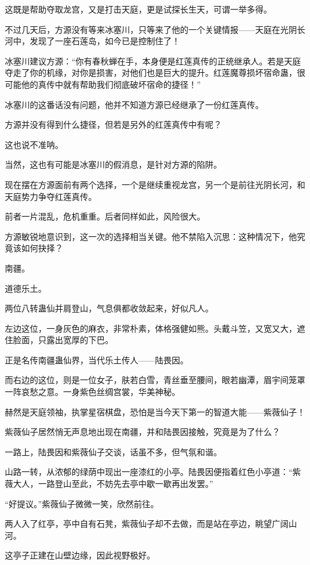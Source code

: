 \begin{this_body}
这既是帮助夺取龙宫，又是打击天庭，更是试探长生天，可谓一举多得。

不过几天后，方源没有等来冰塞川，只等来了他的一个关键情报——天庭在光阴长河中，发现了一座石莲岛，如今已是控制住了！

冰塞川建议方源：“你有春秋蝉在手，本身便是红莲真传的正统继承人。若是天庭夺走了你的机缘，对你是损害，对他们也是巨大的提升。红莲魔尊损坏宿命蛊，很可能他的真传中就有帮助我们彻底破坏宿命的捷径！”

冰塞川的这番话没有问题，他并不知道方源已经继承了一份红莲真传。

方源并没有得到什么捷径，但若是另外的红莲真传中有呢？

这也说不准呐。

当然，这也有可能是冰塞川的假消息，是针对方源的陷阱。

现在摆在方源面前有两个选择，一个是继续重视龙宫，另一个是前往光阴长河，和天庭势力争夺红莲真传。

前者一片混乱，危机重重。后者同样如此，风险很大。

方源敏锐地意识到，这一次的选择相当关键。他不禁陷入沉思：这种情况下，他究竟该如何抉择？

南疆。

道德乐土。

两位八转蛊仙并肩登山，气息俱都收敛起来，好似凡人。

左边这位，一身灰色的麻衣，非常朴素，体格强健如熊。头戴斗笠，又宽又大，遮住脸面，只露出宽厚的下巴。

正是名传南疆蛊仙界，当代乐土传人——陆畏因。

而右边的这位，则是一位女子，肤若白雪，青丝垂至腰间，眼若幽潭，眉宇间笼罩一阵哀愁之意。一身紫色丝绸宫裳，华美神秘。

赫然是天庭领袖，执掌星宿棋盘，恐怕是当今天下第一的智道大能——紫薇仙子！

紫薇仙子居然悄无声息地出现在南疆，并和陆畏因接触，究竟是为了什么？

一路上，陆畏因和紫薇仙子交谈，话虽不多，但气氛和谐。

山路一转，从浓郁的绿荫中现出一座漆红的小亭。陆畏因便指着红色小亭道：“紫薇大人，一路登山至此，不妨先去亭中歇一歇再出发罢。”

“好提议。”紫薇仙子微微一笑，欣然前往。

两人入了红亭，亭中自有石凳，紫薇仙子却不去做，而是站在亭边，眺望广阔山河。

这亭子正建在山壁边缘，因此视野极好。


\end{this_body}
